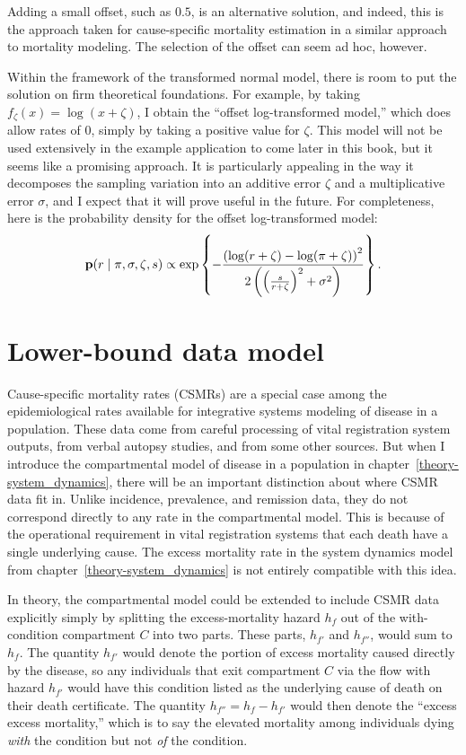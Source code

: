 Adding a small offset, such as $0.5$, is an alternative solution,
and indeed, this is the approach taken for cause-specific mortality
estimation in a similar approach to mortality
modeling.\cite{girosi_demographic_2008} The selection of the offset
can seem ad hoc, however.

Within the framework of the transformed normal model, there is room to
put the solution on firm theoretical foundations.  For example, by
taking $f_\zeta(x) = \log(x + \zeta)$, I obtain the ``offset
log-transformed model,'' which does allow rates of $0$, simply by taking
a positive value for $\zeta$.  This model will not be used extensively
in the example application to come later in this book, but it seems
like a promising approach.  It is particularly appealing in the way it
decomposes the sampling variation into an additive error $\zeta$ and a
multiplicative error $\sigma$, and I expect that it will prove useful
in the future.  For completeness, here is the probability density for
the offset log-transformed model:
\[
\mathbf{p}(r\;|\; \pi, \sigma,\zeta, s)
\propto \exp\left\{
-\frac{\left(\log(r+\zeta)-\log(\pi+\zeta)\right)^2}
      {2\left(\left(\frac{s}{r+\zeta}\right)^2+\sigma^2\right)}
\right\}.
\]

\section{Lower-bound data model}
\label{theory-csmr}
Cause-specific mortality rates (CSMRs) are a special case among the
epidemiological rates available for integrative systems modeling of
disease in a population.  These data come from careful processing of
vital registration system outputs, from verbal autopsy studies, and
from some other sources. But when I introduce the compartmental model
of disease in a population in chapter~\ref{theory-system_dynamics},
there will be an important distinction about where CSMR data fit in.
Unlike incidence, prevalence, and remission data, they do not
correspond directly to any rate in the compartmental model.  This is
because of the operational requirement in vital registration systems
that each death have a single underlying cause.  The excess mortality
rate in the system dynamics model from
chapter~\ref{theory-system_dynamics} is not entirely compatible with
this idea.

In theory, the compartmental model could be extended to include CSMR
data explicitly simply by splitting the excess-mortality hazard $h_f$ out
of the with-condition compartment $C$ into two parts.  These parts,
$h_{f'}$ and $h_{f''}$, would sum to $h_f$. The quantity $h_{f'}$ would denote the portion of
excess mortality caused directly by the disease, so any individuals
that exit compartment $C$ via the flow with hazard $h_{f'}$ would have this condition
listed as the underlying cause of death on their death certificate.
The quantity $h_{f''} = h_{f} - h_{f'}$ would then denote the ``excess excess mortality,''
which is to say the elevated mortality among individuals dying
\emph{with} the condition but not \emph{of} the condition.

